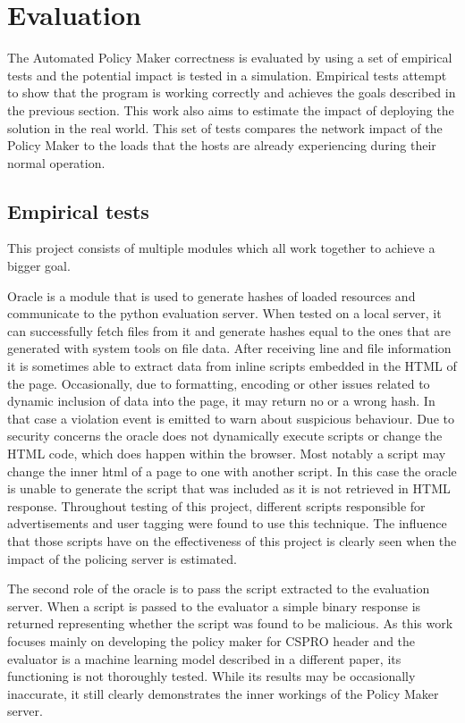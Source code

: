 \chapter{Evaluation}

The Automated Policy Maker correctness is evaluated by using a set of empirical tests and the potential impact is tested in a simulation.
Empirical tests attempt to show that the program is working correctly and achieves the goals described in the previous section.
This work also aims to estimate the impact of deploying the solution in the real world.
This set of tests compares the network impact of the Policy Maker to the loads that the hosts are already experiencing during their normal operation.

\section{Empirical tests}

This project consists of multiple modules which all work together to achieve a bigger goal.

Oracle is a module that is used to generate hashes of loaded resources and communicate to the python evaluation server.
When tested on a local server, it can successfully fetch files from it and generate hashes equal to the ones that are generated with system tools on file data.
After receiving line and file information it is sometimes able to extract data from inline scripts embedded in the HTML of the page.
Occasionally, due to formatting, encoding or other issues related to dynamic inclusion of data into the page, it may return no or a wrong hash.
In that case a violation event is emitted to warn about suspicious behaviour.
Due to security concerns the oracle does not dynamically execute scripts or change the HTML code, which does happen within the browser.
Most notably a script may change the inner html of a page to one with another script.
In this case the oracle is unable to generate the script that was included as it is not retrieved in HTML response.
Throughout testing of this project, different scripts responsible for advertisements and user tagging were found to use this technique.
The influence that those scripts have on the effectiveness of this project is clearly seen when the impact of the policing server is estimated.

The second role of the oracle is to pass the script extracted to the evaluation server.
When a script is passed to the evaluator a simple binary response is returned representing whether the script was found to be malicious.
As this work focuses mainly on developing the policy maker for CSPRO header and the evaluator is a machine learning model described in a different paper, its functioning is not thoroughly tested.
While its results may be occasionally inaccurate, it still clearly demonstrates the inner workings of the Policy Maker server.

